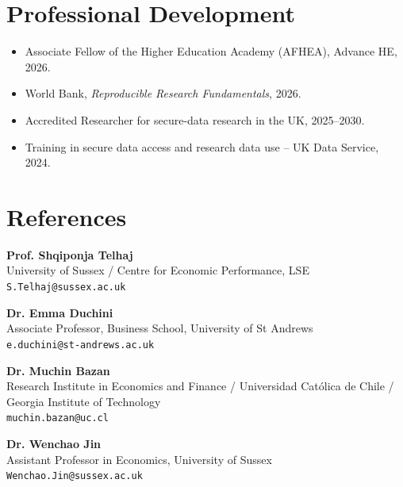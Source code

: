 \documentclass[10pt,a4paper]{article}
\newcommand{\referee}[3]{%
  \textbf{#1}\\ {\small #2}\\ {\small\texttt{#3}}\par\vspace{0.5ex}}
\begin{document}
\section{Professional Development}
\begin{itemize}
  \item Associate Fellow of the Higher Education Academy (AFHEA), Advance HE, 2026.
  \item World Bank, \textit{Reproducible Research Fundamentals}, 2026.
  \item Accredited Researcher for secure-data research in the UK, 2025--2030.
  \item Training in secure data access and research data use -- UK Data Service, 2024.
\end{itemize}

\section{References}
\begin{minipage}[t]{0.49\linewidth}
\referee{Prof. Shqiponja Telhaj}{University of Sussex / Centre for Economic Performance, LSE}{S.Telhaj@sussex.ac.uk}
\referee{Dr. Emma Duchini}{Associate Professor, Business School, University of St Andrews}{e.duchini@st-andrews.ac.uk}
\end{minipage}\hfill
\begin{minipage}[t]{0.49\linewidth}
\referee{Dr. Muchin Bazan}{Research Institute in Economics and Finance / Universidad Católica de Chile / Georgia Institute of Technology}{muchin.bazan@uc.cl}
\referee{Dr. Wenchao Jin}{Assistant Professor in Economics, University of Sussex}{Wenchao.Jin@sussex.ac.uk}
\end{minipage}
\end{document}
